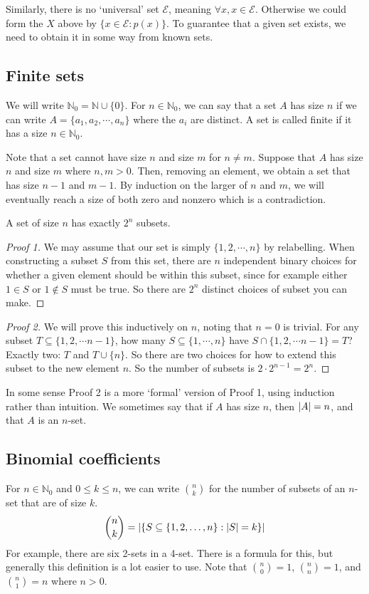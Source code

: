Similarly, there is no `universal' set \(\mathscr E\), meaning \(\forall x, x \in \mathscr E\).
Otherwise we could form the \(X\) above by \(\{ x \in \mathscr E: p(x) \}\).
To guarantee that a given set exists, we need to obtain it in some way from known sets.

\subsection{Finite sets}
We will write \(\mathbb N_0 = \mathbb N \cup \{ 0 \}\).
For \(n \in \mathbb N_0\), we can say that a set \(A\) has size \(n\) if we can write \(A = \{ a_1, a_2, \cdots, a_n \}\) where the \(a_i\) are distinct.
A set is called finite if it has a size \(n \in \mathbb N_0\).

Note that a set cannot have size \(n\) and size \(m\) for \(n \neq m\).
Suppose that \(A\) has size \(n\) and size \(m\) where \(n, m > 0\).
Then, removing an element, we obtain a set that has size \(n-1\) and \(m-1\).
By induction on the larger of \(n\) and \(m\), we will eventually reach a size of both zero and nonzero which is a contradiction.

\begin{proposition}
	A set of size \(n\) has exactly \(2^n\) subsets.
\end{proposition}
\begin{proof}[Proof 1]
	We may assume that our set is simply \(\{ 1, 2, \cdots, n \}\) by relabelling.
	When constructing a subset \(S\) from this set, there are \(n\) independent binary choices for whether a given element should be within this subset, since for example either \(1 \in S\) or \(1 \notin S\) must be true.
	So there are \(2^n\) distinct choices of subset you can make.
\end{proof}
\begin{proof}[Proof 2]
	We will prove this inductively on \(n\), noting that \(n=0\) is trivial.
	For any subset \(T \subseteq \{ 1, 2, \cdots n-1 \}\), how many \(S \subseteq \{ 1, \cdots, n \}\) have \(S \cap \{ 1, 2, \cdots n-1 \} = T\)?
	Exactly two: \(T\) and \(T \cup \{ n \}\).
	So there are two choices for how to extend this subset to the new element \(n\).
	So the number of subsets is \(2 \cdot 2^{n-1} = 2^n\).
\end{proof}
In some sense Proof 2 is a more `formal' version of Proof 1, using induction rather than intuition.
We sometimes say that if \(A\) has size \(n\), then \(\abs{A} = n\), and that \(A\) is an \(n\)-set.

\subsection{Binomial coefficients}
For \(n \in \mathbb N_0\) and \(0 \leq k \leq n\), we can write \(\binom{n}{k}\) for the number of subsets of an \(n\)-set that are of size \(k\).
\[
	\binom{n}{k} = \abs{\left\{ S \subseteq \{ 1, 2, \dots, n \}: \abs{S} = k \right\}}
\]
For example, there are six 2-sets in a 4-set.
There is a formula for this, but generally this definition is a lot easier to use.
Note that \(\binom{n}{0} = 1\), \(\binom{n}{n} = 1\), and \(\binom{n}{1}=n\) where \(n>0\).

